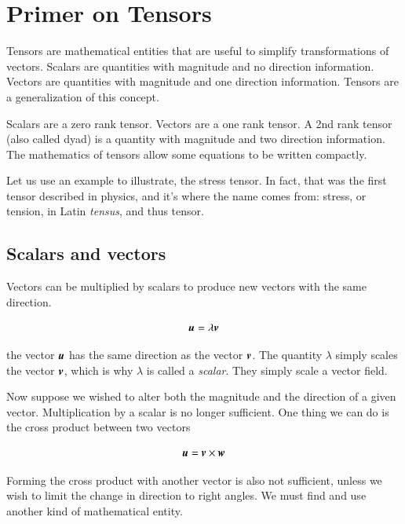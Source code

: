 \chapter{Primer on Tensors}
\label{app:tensor}


Tensors are mathematical entities that are useful to simplify transformations of vectors. Scalars are quantities with magnitude and no direction information. Vectors are quantities with magnitude and one direction information. Tensors are a generalization of this concept. 

Scalars are a zero rank tensor. Vectors are a one rank tensor. A 2nd rank tensor (also called dyad) is a quantity with magnitude and two direction information. The mathematics of tensors allow some equations to be written compactly. 


Let us use an example to illustrate, the stress tensor. In fact, that
was the first tensor described in physics, and it's where the name
comes from: stress, or tension, in Latin {\it tensus}, and thus
tensor.

\section{Scalars and vectors}

Vectors can be multiplied by scalars to produce new vectors with the same  direction.

\begin{equation}
{\boldsymbol{u}} = \lambda {\boldsymbol{v}}
\end{equation}

\noindent the vector ${\boldsymbol{u}}$ has the same direction as the vector
${\boldsymbol{v}}$. The quantity $\lambda$ simply scales the vector
${\boldsymbol{v}}$, which is why $\lambda$ is called a {\it scalar}. They simply scale a vector field. 


Now suppose we wished to alter both the magnitude and the direction of a given vector. Multiplication by a scalar is no longer sufficient. One thing we can do is the cross product between two vectors 

\begin{equation}
{\boldsymbol{u}} =  {\boldsymbol{v}}\times{\boldsymbol{w}}
\end{equation}

Forming the cross product with another vector is also not sufficient, unless we wish to limit the change in direction to right angles. We must find and use another kind of mathematical entity.



